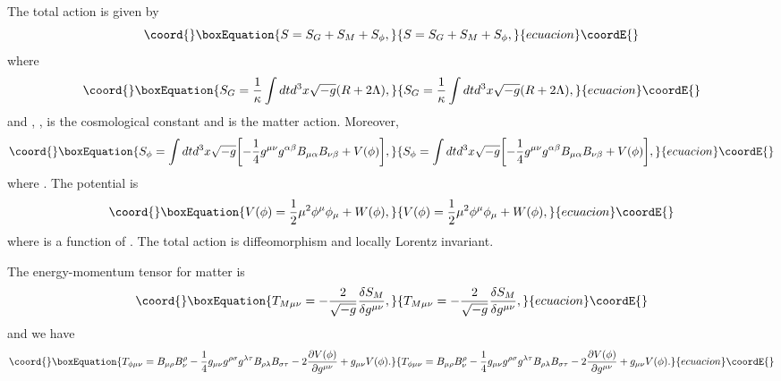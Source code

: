 \documentclass[a4paper,12pt]{article}
\begin{document}
The total action is given by
\begin{equation}\coord{}\boxEquation{
S=S_G+S_M+S_\phi,
}{
S=S_G+S_M+S_\phi,
}{ecuacion}\coordE{}\end{equation}
where
\begin{equation}\coord{}\boxEquation{
\label{grav}
S_G=\frac{1}{\kappa}\int dtd^3x\sqrt{-g}(R+2\Lambda),
}{
S_G=\frac{1}{\kappa}\int dtd^3x\sqrt{-g}(R+2\Lambda),
}{ecuacion}\coordE{}\end{equation}
and \coordHE{}, \coordHE{}, \myHighlight{$\Lambda$}\coordHE{} is the
cosmological constant and \coordHE{} is the matter action. Moreover,
\begin{equation}\coord{}\boxEquation{
\label{Proca}
S_\phi=\int
dtd^3x\sqrt{-g}\biggl[-\frac{1}{4}g^{\mu\nu}g^{\alpha\beta}B_{\mu\alpha}B_{\nu\beta}
+V(\phi)\biggr],
}{
S_\phi=\int
dtd^3x\sqrt{-g}\biggl[-\frac{1}{4}g^{\mu\nu}g^{\alpha\beta}B_{\mu\alpha}B_{\nu\beta}
+V(\phi)\biggr],
}{ecuacion}\coordE{}\end{equation}
where \coordHE{}. The potential \coordHE{} is
\begin{equation}\coord{}\boxEquation{
V(\phi)=\frac{1}{2}\mu^2\phi^\mu\phi_\mu+W(\phi),
}{
V(\phi)=\frac{1}{2}\mu^2\phi^\mu\phi_\mu+W(\phi),
}{ecuacion}\coordE{}\end{equation}
where \coordHE{} is a function of \myHighlight{$\phi^\mu\phi_\mu$}\coordHE{}. The total action \coordHE{} is
diffeomorphism and locally Lorentz invariant.

The energy-momentum tensor for matter is
\begin{equation}\coord{}\boxEquation{
T_{M\mu\nu}=-\frac{2}{\sqrt{-g}}\frac{\delta S_M}{\delta
g^{\mu\nu}},
}{
T_{M\mu\nu}=-\frac{2}{\sqrt{-g}}\frac{\delta S_M}{\delta
g^{\mu\nu}},
}{ecuacion}\coordE{}\end{equation}
and we have
\begin{equation}\coord{}\boxEquation{
T_{\phi\mu\nu}=B_{\mu\rho}B^\rho_\nu-\frac{1}{4}g_{\mu\nu}g^{\rho\sigma}
g^{\lambda\tau}B_{\rho\lambda}B_{\sigma\tau}-2\frac{\partial V(\phi)}
{\partial g^{\mu\nu}}+g_{\mu\nu}V(\phi).
}{
T_{\phi\mu\nu}=B_{\mu\rho}B^\rho_\nu-\frac{1}{4}g_{\mu\nu}g^{\rho\sigma}
g^{\lambda\tau}B_{\rho\lambda}B_{\sigma\tau}-2\frac{\partial V(\phi)}
{\partial g^{\mu\nu}}+g_{\mu\nu}V(\phi).
}{ecuacion}\coordE{}\end{equation}
\end{document}

